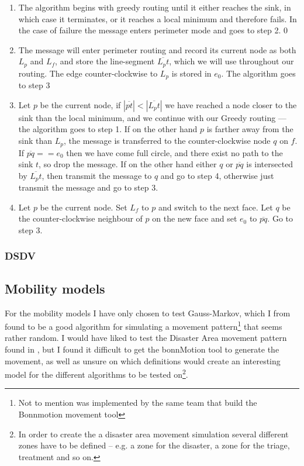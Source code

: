 \begin{enumerate}
\item The algorithm begins with greedy routing until it either reaches the sink, in which case it terminates, or it reaches a local minimum and therefore fails. In the case of failure the message enters perimeter mode and goes to step 2.
0\item The message will enter perimeter routing and record its current node as both $L_p$ and $L_f$, and store the line-segment $\overline{L_pt}$, which we will use throughout our routing. The edge counter-clockwise to $L_p$ is stored in $e_0$. The algorithm goes to step 3
\item Let $p$ be the current node, if $|\overline{pt}| < |\overline{L_pt}|$ we have reached a node closer to the sink than the local minimum, and we continue with our Greedy routing --- the algorithm goes to step 1. If on the other hand $p$ is farther away from the sink than $L_p$, the message is transferred to the counter-clockwise node $q$ on $f$. If $\overline{pq} == e_0$ then we have come full circle, and there exist no path to the sink $t$, so drop the message. If on the other hand either $q$ or $\overline{pq}$ is intersected by $\overline{L_pt}$, then transmit the message to $q$ and go to step 4, otherwise just transmit the message and go to step 3.
\item Let $p$ be the current node. Set $L_f$ to $p$ and switch to the next face. Let $q$ be the counter-clockwise neighbour of $p$ on the new face and set $e_0$ to $\overline{pq}$. Go to step 3. 
\end{enumerate}

\subsubsection{DSDV}


\subsection{Mobility models}

For the mobility models I have only chosen to test Gauss-Markov, which I from \cite{MobilityAdHocResearch} found to be a good algorithm for simulating a movement pattern\footnote{Not to mention was implemented by the same team that build the Bonnmotion movement tool} that seems rather random. I would have liked to test the Disaster Area movement pattern found in \cite{disasterArea}, but I found it difficult to get the bonnMotion tool to generate the movement, as well as unsure on which definitions would create an interesting model for the different algorithms to be tested on\footnote{In order to create the a disaster area movement simulation several different zones have to be defined -- e.g. a zone for the disaster, a zone for the triage, treatment and so on.}. 


